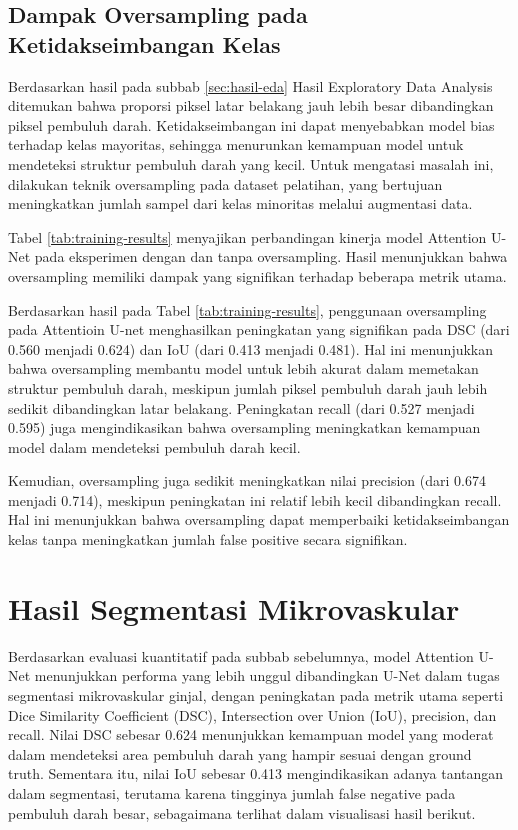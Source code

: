 \subsection{Dampak Oversampling pada Ketidakseimbangan Kelas}

\noindent Berdasarkan hasil pada subbab \ref{sec:hasil-eda} Hasil Exploratory Data Analysis ditemukan bahwa proporsi piksel latar belakang jauh lebih besar dibandingkan piksel pembuluh darah. Ketidakseimbangan ini dapat menyebabkan model bias terhadap kelas mayoritas, sehingga menurunkan kemampuan model untuk mendeteksi struktur pembuluh darah yang kecil. Untuk mengatasi masalah ini, dilakukan teknik oversampling pada dataset pelatihan, yang bertujuan meningkatkan jumlah sampel dari kelas minoritas melalui augmentasi data.


\noindent Tabel \ref{tab:training-results} menyajikan perbandingan kinerja model Attention U-Net pada eksperimen dengan dan tanpa oversampling. Hasil menunjukkan bahwa oversampling memiliki dampak yang signifikan terhadap beberapa metrik utama.

\noindent Berdasarkan hasil pada Tabel \ref{tab:training-results}, penggunaan oversampling pada Attentioin U-net menghasilkan peningkatan yang signifikan pada DSC (dari 0.560 menjadi 0.624) dan IoU (dari 0.413 menjadi 0.481). Hal ini menunjukkan bahwa oversampling membantu model untuk lebih akurat dalam memetakan struktur pembuluh darah, meskipun jumlah piksel pembuluh darah jauh lebih sedikit dibandingkan latar belakang. Peningkatan recall (dari 0.527 menjadi 0.595) juga mengindikasikan bahwa oversampling meningkatkan kemampuan model dalam mendeteksi pembuluh darah kecil.

\noindent Kemudian, oversampling juga sedikit meningkatkan nilai precision (dari 0.674 menjadi 0.714), meskipun peningkatan ini relatif lebih kecil dibandingkan recall. Hal ini menunjukkan bahwa oversampling dapat memperbaiki ketidakseimbangan kelas tanpa meningkatkan jumlah false positive secara signifikan.


\section{Hasil Segmentasi Mikrovaskular}

\noindent Berdasarkan evaluasi kuantitatif pada subbab sebelumnya, model Attention U-Net menunjukkan performa yang lebih unggul dibandingkan U-Net dalam tugas segmentasi mikrovaskular ginjal, dengan peningkatan pada metrik utama seperti Dice Similarity Coefficient (DSC), Intersection over Union (IoU), precision, dan recall. Nilai DSC sebesar 0.624 menunjukkan kemampuan model yang moderat dalam mendeteksi area pembuluh darah yang hampir sesuai dengan ground truth. Sementara itu, nilai IoU sebesar 0.413 mengindikasikan adanya tantangan dalam segmentasi, terutama karena tingginya jumlah false negative pada pembuluh darah besar, sebagaimana terlihat dalam visualisasi hasil berikut.


